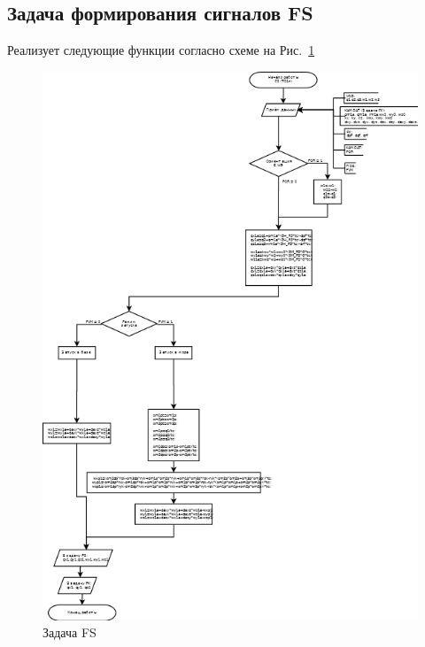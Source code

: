 \subsection{Задача формирования сигналов FS}
Реализует следующие функции согласно схеме на Рис.~\ref{fig:FS}
\begin{figure}[H]
    \centering
    \includegraphics[width=0.8\linewidth]{images/FS.png}
    \caption{Задача FS}
    \label{fig:FS}
\end{figure}
